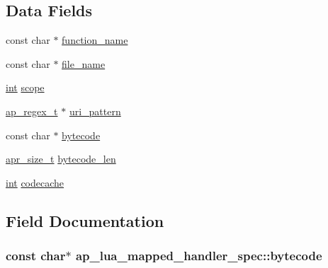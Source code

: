 \subsection*{Data Fields}
\begin{DoxyCompactItemize}
\item 
const char $\ast$ \hyperlink{structap__lua__mapped__handler__spec_a471d067a3dcc2980334020be4c73cf8b}{function\+\_\+name}
\item 
const char $\ast$ \hyperlink{structap__lua__mapped__handler__spec_a1a4042989a03ff9ded20a267ecefe2cd}{file\+\_\+name}
\item 
\hyperlink{pcre_8txt_a42dfa4ff673c82d8efe7144098fbc198}{int} \hyperlink{structap__lua__mapped__handler__spec_aa66c7647e53efa573082e52b92ecc3d7}{scope}
\item 
\hyperlink{structap__regex__t}{ap\+\_\+regex\+\_\+t} $\ast$ \hyperlink{structap__lua__mapped__handler__spec_aeaa55c857b32e7136b4e20db934404ff}{uri\+\_\+pattern}
\item 
const char $\ast$ \hyperlink{structap__lua__mapped__handler__spec_a2c8364b74e4a9eb1a72bab3e16479672}{bytecode}
\item 
\hyperlink{group__apr__platform_gaaa72b2253f6f3032cefea5712a27540e}{apr\+\_\+size\+\_\+t} \hyperlink{structap__lua__mapped__handler__spec_a84fa859a0d3167fe62957de2fc2e8446}{bytecode\+\_\+len}
\item 
\hyperlink{pcre_8txt_a42dfa4ff673c82d8efe7144098fbc198}{int} \hyperlink{structap__lua__mapped__handler__spec_a2eab622fcf3e884a91dc1db3ed25f385}{codecache}
\end{DoxyCompactItemize}


\subsection{Field Documentation}
\subsubsection[{\texorpdfstring{bytecode}{bytecode}}]{\setlength{\rightskip}{0pt plus 5cm}const char$\ast$ ap\+\_\+lua\+\_\+mapped\+\_\+handler\+\_\+spec\+::bytecode}\hypertarget{structap__lua__mapped__handler__spec_a2c8364b74e4a9eb1a72bab3e16479672}{}\label{structap__lua__mapped__handler__spec_a2c8364b74e4a9eb1a72bab3e16479672}
